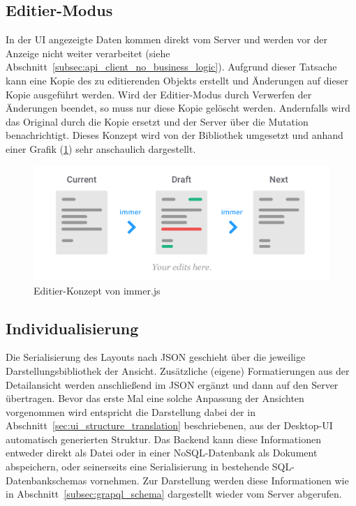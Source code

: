\subsection{Editier-Modus}
In der UI angezeigte Daten kommen direkt vom Server und werden vor der Anzeige nicht weiter verarbeitet (siehe Abschnitt~\ref{subsec:api_client_no_business_logic}). Aufgrund dieser Tatsache kann eine Kopie des zu editierenden Objekts erstellt und Änderungen auf dieser Kopie ausgeführt werden. Wird der Editier-Modus durch Verwerfen der Änderungen beendet, so muss nur diese Kopie gelöscht werden. Andernfalls wird das Original durch die Kopie ersetzt und der Server über die Mutation benachrichtigt. Dieses Konzept wird von der Bibliothek  \parencite{weststrate_2019} umgesetzt und anhand einer Grafik (\ref{fig:immer_draft_concept}) sehr anschaulich dargestellt.

\begin{figure}
    \centering
    \captionsetup{justification=centering}
    \includegraphics[width=\textwidth]{figures/immer_draft_concept.png}
        \caption{Editier-Konzept von immer.js \parencite{weststrate_2019}}\label{fig:immer_draft_concept}
\end{figure}

\subsection{Individualisierung}
Die Serialisierung des Layouts nach JSON geschieht über die jeweilige Darstellungsbibliothek der Ansicht. Zusätzliche (eigene) Formatierungen aus der Detailansicht werden anschließend im JSON ergänzt und dann auf den Server übertragen. Bevor das erste Mal eine solche Anpassung der Ansichten vorgenommen wird entspricht die Darstellung dabei der in Abschnitt~\ref{sec:ui_structure_translation} beschriebenen, aus der Desktop-UI automatisch generierten Struktur. Das Backend kann diese Informationen entweder direkt als Datei oder in einer NoSQL-Datenbank als Dokument abspeichern, oder seinerseits eine Serialisierung in bestehende SQL-Datenbankschemas vornehmen. Zur Darstellung werden diese Informationen wie in Abschnitt~\ref{subsec:grapql_schema} dargestellt wieder vom Server abgerufen.

